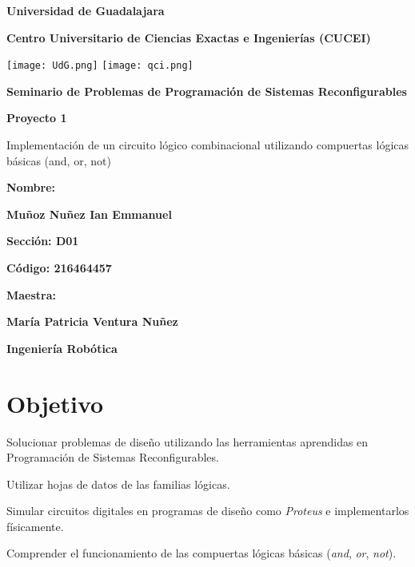 \documentclass[12pt, oneside, openany]{article}
\begin{document}
\begin{titlepage}
    \centering
    {\bfseries\LARGE Universidad de Guadalajara \par}
    \vfill
    {\bfseries\LARGE Centro Universitario de Ciencias Exactas e Ingenierías (CUCEI) \par}
    \vfill
    {
        \texttt{[image: UdG.png]}
        \texttt{[image: qci.png]}
        \par
    }
    \vfill
    {\bfseries\LARGE Seminario de Problemas de Programación de Sistemas Reconfigurables \par}
    \vfill
    {\bfseries\LARGE Proyecto 1 \par}
    \vfill
    {\LARGE Implementación de un circuito lógico combinacional utilizando compuertas lógicas básicas (and, or, not) \par}
    \vfill
    {\bfseries\LARGE Nombre: \par}
    \vfill
    {\bfseries\LARGE Muñoz Nuñez Ian Emmanuel \par}
    \vfill
    {\bfseries\LARGE Sección: D01 \par}
    \vfill
    {\bfseries\LARGE Código: 216464457 \par}
    \vfill
    {\bfseries\LARGE Maestra: \par}
    \vfill
    {\bfseries\LARGE María Patricia Ventura Nuñez \par}
    \vfill
    {\bfseries\LARGE Ingeniería Robótica \par}
\end{titlepage}

\newpage
\section{Objetivo}
{\sffamily\Large
    \hspace{0.5cm} Solucionar problemas de diseño utilizando las herramientas aprendidas en Programación de Sistemas Reconfigurables.
    
    \hspace{0.5cm} Utilizar hojas de datos de las familias lógicas.
    
    \hspace{0.5cm} Simular circuitos digitales en programas de diseño como \emph{Proteus\texttrademark} e implementarlos físicamente.
    
    \hspace{0.5cm} Comprender el funcionamiento de las compuertas lógicas básicas (\emph{and}, \emph{or}, \emph{not}).
    
}
\end{document}
